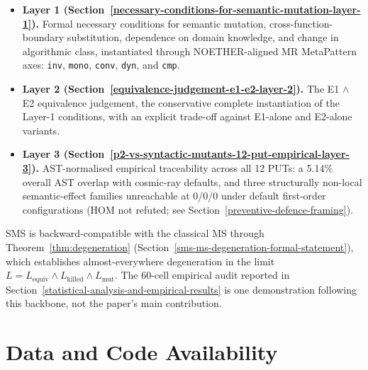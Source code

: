 \documentclass[manuscript,screen,review]{acmart}
\begin{document}
\begin{itemize}

\item
  \textbf{Layer 1 (Section~\ref{necessary-conditions-for-semantic-mutation-layer-1}).} Formal necessary conditions for semantic
  mutation, cross-function-boundary substitution, dependence on domain
  knowledge, and change in algorithmic class, instantiated through
  NOETHER-aligned MR MetaPattern axes: \texttt{inv}, \texttt{mono},
  \texttt{conv}, \texttt{dyn}, and \texttt{cmp}.
\item
  \textbf{Layer 2 (Section~\ref{equivalence-judgement-e1-e2-layer-2}).} The E1 $\wedge$ E2 equivalence judgement, the
  conservative complete instantiation of the Layer-1 conditions, with an
  explicit trade-off against E1-alone and E2-alone variants.
\item
  \textbf{Layer 3 (Section~\ref{p2-vs-syntactic-mutants-12-put-empirical-layer-3}).} AST-normalised empirical traceability across
  all 12 PUTs: a 5.14\% overall AST overlap with cosmic-ray defaults,
  and three structurally non-local semantic-effect families unreachable
  at 0/0/0 under default first-order
  configurations (HOM not refuted; see Section~\ref{preventive-defence-framing}).
\end{itemize}

SMS is backward-compatible with the classical MS through
Theorem~\ref{thm:degeneration} (Section~\ref{sms-ms-degeneration-formal-statement}), which establishes almost-everywhere degeneration in the limit
$L = L_{\mathrm{equiv}} \wedge L_{\mathrm{killed}} \wedge L_{\mathrm{mut}}$. The 60-cell empirical
audit reported in Section~\ref{statistical-analysis-and-empirical-results} is one demonstration following this backbone, not
the paper's main contribution.

\section*{Data and Code Availability}\label{data-and-code-availability}
\end{document}
